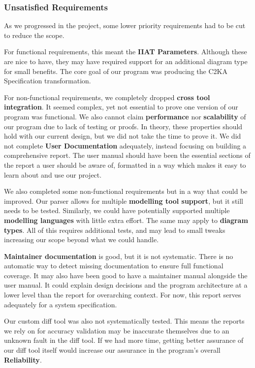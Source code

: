     \newpage
    \subsubsection{Unsatisfied Requirements} \label{subsubsec:unsat-reqs}
    As we progressed in the project, some lower priority requirements had to be cut to reduce the scope.

    For functional requirements, this meant the \textbf{IIAT Parameters}.
    Although these are nice to have, they may have required support for an additional diagram type for small benefits.
    The core goal of our program was producing the C2KA Specification transformation.

    For non-functional requirements, we completely dropped \textbf{cross tool integration}.
    It seemed complex, yet not essential to prove one version of our program was functional.
    We also cannot claim \textbf{performance} nor \textbf{scalability} of our program due to lack of testing or proofs.
    In theory, these properties should hold with our current design, but we did not take the time to prove it.
    We did not complete \textbf{User Documentation} adequately, instead focusing on building a comprehensive report.
    The user manual should have been the essential sections of the report a user should be aware of,
    formatted in a way which makes it easy to learn about and use our project.

    We also completed some non-functional requirements but in a way that could be improved.
    Our parser allows for multiple \textbf{modelling tool support}, but it still needs to be tested.
    Similarly, we could have potentially supported multiple \textbf{modelling languages} with little extra effort.
    The same may apply to \textbf{diagram types}.
    All of this requires additional tests, and may lead to small tweaks increasing our scope beyond what we could handle.

    \textbf{Maintainer documentation} is good, but it is not systematic.
    There is no automatic way to detect missing documentation to ensure full functional coverage.
    It may also have been good to have a maintainer manual alongside the user manual.
    It could explain design decisions and the program architecture at a lower level than the report for overarching context.
    For now, this report serves adequately for a system specification.

    Our custom diff tool was also not systematically tested.
    This means the reports we rely on for accuracy validation may be inaccurate themselves due to an unknown fault in the diff tool.
    If we had more time, getting better assurance of our diff tool itself would increase our assurance in the program's overall
    \textbf{Reliability}.

